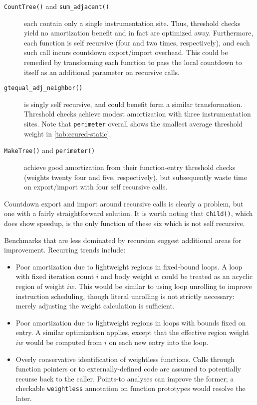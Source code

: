 \begin{description}
\item[\texttt{CountTree()} and \texttt{sum\_adjacent()}] each contain
  only a single instrumentation site.  Thus, threshold checks yield no
  amortization benefit and in fact are optimized away.  Furthermore,
  each function is self recursive (four and two times, respectively),
  and each such call incurs countdown export/import overhead.  This
  could be remedied by transforming each function to pass the local
  countdown to itself as an additional parameter on recursive calls.
  
\item[\texttt{gtequal\_adj\_neighbor()}] is singly self recursive, and
  could benefit form a similar transformation.  Threshold checks
  achieve modest amortization with three instrumentation sites.  Note
  that \texttt{perimeter} overall shows the smallest average threshold
  weight in \autoref{tab:ccured-static}.
  
\item[\texttt{MakeTree()} and \texttt{perimeter()}] achieve good
  amortization from their function-entry threshold checks (weights
  twenty four and five, respectively), but subsequently waste time on
  export/import with four self recursive calls.
\end{description}

Countdown export and import around recursive calls is clearly a
problem, but one with a fairly straightforward solution.  It is worth
noting that \texttt{child()}, which does show speedup, is the only
function of these six which is not self recursive.

Benchmarks that are less dominated by recursion suggest additional
areas for improvement.  Recurring trends include:

\begin{itemize}
\item Poor amortization due to lightweight regions in fixed-bound
  loops.  A loop with fixed iteration count $i$ and body weight $w$
  could be treated as an acyclic region of weight $iw$.  This would be
  similar to using loop unrolling to improve instruction scheduling,
  though literal unrolling is not strictly necessary: merely adjusting
  the weight calculation is sufficient.
  
\item Poor amortization due to lightweight regions in loops with
  bounds fixed on entry.  A similar optimization applies, except that
  the effective region weight $iw$ would be computed from $i$ on each
  new entry into the loop.
  
\item Overly conservative identification of weightless functions.
  Calls through function pointers or to externally-defined code are
  assumed to potentially recurse back to the caller.  Points-to
  analyses can improve the former; a checkable \texttt{weightless}
  annotation on function prototypes would resolve the later.
\end{itemize}

